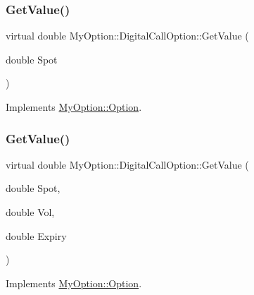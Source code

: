 \subsubsection{\texorpdfstring{Get\+Value()}{GetValue()}\hspace{0.1cm}{\footnotesize\ttfamily [1/3]}}
{\footnotesize\ttfamily virtual double My\+Option\+::\+Digital\+Call\+Option\+::\+Get\+Value (\begin{DoxyParamCaption}\item[{double}]{Spot }\end{DoxyParamCaption})\hspace{0.3cm}{\ttfamily [virtual]}}



Implements \hyperlink{classMyOption_1_1Option_aff32b402a5e44fca9e5a22a142fbbdd6}{My\+Option\+::\+Option}.

\hypertarget{classMyOption_1_1DigitalCallOption_a353ecc50b8e9efa5c4c2cc06454760b6}{}\label{classMyOption_1_1DigitalCallOption_a353ecc50b8e9efa5c4c2cc06454760b6} 
\subsubsection{\texorpdfstring{Get\+Value()}{GetValue()}\hspace{0.1cm}{\footnotesize\ttfamily [2/3]}}
{\footnotesize\ttfamily virtual double My\+Option\+::\+Digital\+Call\+Option\+::\+Get\+Value (\begin{DoxyParamCaption}\item[{double}]{Spot,  }\item[{double}]{Vol,  }\item[{double}]{Expiry }\end{DoxyParamCaption})\hspace{0.3cm}{\ttfamily [virtual]}}



Implements \hyperlink{classMyOption_1_1Option_a78fa248dcb939e0ebaefbb944d5d9cf8}{My\+Option\+::\+Option}.

\hypertarget{classMyOption_1_1DigitalCallOption_a75391ad8c6b599e0c181c965d01cd610}{}\label{classMyOption_1_1DigitalCallOption_a75391ad8c6b599e0c181c965d01cd610} 
